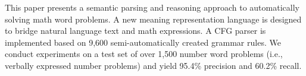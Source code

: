 This paper presents a semantic parsing and reasoning approach to automatically solving math word problems. A new meaning representation language is designed to bridge natural language text and math expressions. A CFG parser is implemented based on 9,600 semi-automatically created grammar rules. We conduct experiments on a test set of over 1,500 number word problems (i.e., verbally expressed number problems) and yield 95.4\% precision and 60.2\% recall.
